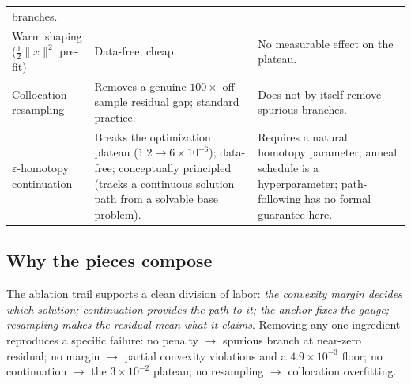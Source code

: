 \documentclass[11pt,a4paper]{article}
\begin{document}
\begin{table}[h]
\begin{tabularx}{\textwidth}{lXX}
branches. \\
\addlinespace
Warm shaping ($\tfrac12\|x\|^2$ pre-fit) &
Data-free; cheap. &
No measurable effect on the plateau. \\
\addlinespace
Collocation resampling &
Removes a genuine $100\times$ off-sample residual gap; standard practice. &
Does not by itself remove spurious branches. \\
\addlinespace
$\varepsilon$-homotopy continuation &
Breaks the optimization plateau ($1.2 \to 6\times10^{-6}$); data-free;
conceptually principled (tracks a continuous solution path from a solvable
base problem). &
Requires a natural homotopy parameter; anneal schedule is a hyperparameter;
path-following has no formal guarantee here. \\
\bottomrule
\end{tabularx}
\end{table}

\subsection{Why the pieces compose}
The ablation trail supports a clean division of labor:
\emph{the convexity margin decides which solution; continuation provides the
path to it; the anchor fixes the gauge; resampling makes the residual mean
what it claims}. Removing any one ingredient reproduces a specific failure:
no penalty $\to$ spurious branch at near-zero residual; no margin $\to$
partial convexity violations and a $4.9\times10^{-3}$ floor; no continuation
$\to$ the $3\times10^{-2}$ plateau; no resampling $\to$ collocation
overfitting.
\end{document}
